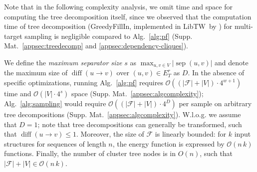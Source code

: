 \documentclass{bioinfo}
\newcommand{\separator}[2]{\operatorname{sep}(#1,#2)}
\newcommand{\difference}[2]{\operatorname{diff}(#1 \rightarrow #2)}
\newcommand{\F}{\mathcal{F}}
\newcommand{\edgesToR}{E^r_T}
\newcommand{\Software}[1]{{\ttfamily #1}}
\begin{document}
Note that in the following complexity analysis, we omit time and space for computing the
tree decomposition itself, since we observed that the computation time
of tree decomposition (\Software{GreedyFillIn}, implemented in
\Software{LibTW}~by \citet{Dijk2006}) for multi-target sampling is
negligible compared to Alg.~\ref{alg:pf}
(Supp. Mat.~\ref{appsec:treedecomp} and
\ref{appsec:dependency-cliques}).

We define the \emph{maximum separator size} $s$ as
$\max_{u,v\in V} | \separator{u}{v} |$ and denote the maximum size of
$\difference{u}{v}$ over $(u,v)\in\edgesToR{}$ as $D$.  In the absence
of specific optimizations, running Alg.~\ref{alg:pf} requires
$\mathcal{O}((|\F|+|V|)\cdot 4^{w+1})$ time and
$\mathcal{O}(|V|\cdot4^s)$ space
(Supp. Mat.~\ref{appsec:algcomplexity}); Alg.~\ref{alg:sampling} would
require $\mathcal{O}((|\F|+|V|)\cdot 4^D)$ per sample on arbitrary
tree decompositions
(Supp. Mat.~\ref{appsec:algcomplexity}). W.l.o.g. we assume that
$D=1$; note that tree decompositions can generally be transformed,
such that $\difference{u}{v}\leq 1$.
%
Moreover, the size of $\F$ is linearly bounded: for $k$
input structures for sequences of length $n$, the energy function is
expressed by $\mathcal{O}(n\,k)$ functions. Finally, the number of cluster
tree nodes is in $O(n)$, such that $|\F|+|V| \in \mathcal{O}(n\,k)$.
\end{document}
